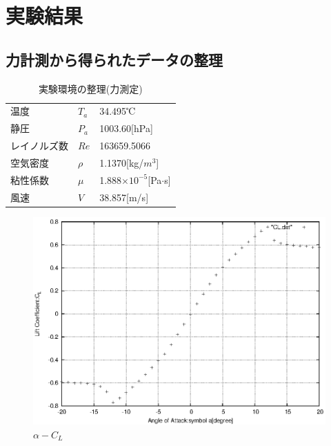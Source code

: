 \documentclass[a4j,twoside,openright,11pt]{jarticle}
\begin{document}
\section{実験結果}
\subsection{力計測から得られたデータの整理}
\begin{table}[htb]
\begin{center}
  \caption{実験環境の整理(力測定)}
  \begin{tabular}{lll} \hline
温度        &$T_a$  &34.495℃\\
静圧        &$P_a$  &1003.60[hPa]\\
レイノルズ数&$Re$   &163659.5066\\
空気密度    &$\rho$ &1.1370[kg/$m^3$]\\
粘性係数    &$\mu$  &1.888$\times 10^{-5}$[Pa$\cdot$s]\\
風速        &$V$    &38.857[m/s]\\
\hline
  \end{tabular}
\end{center}
\end{table}

\newpage
\begin{figure}[htbp]
\begin{center}
\includegraphics[width=12cm]{./CL/CL.eps}
\end{center}
\caption{$\alpha - C_L$}
\end{figure}
\end{document}
